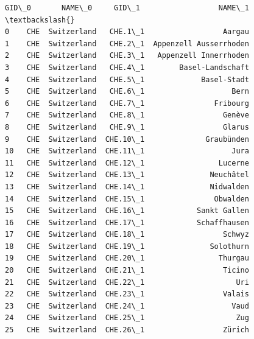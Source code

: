 \documentclass[11pt]{article}
\begin{document}
            \begin{tcolorbox}[breakable, size=fbox, boxrule=.5pt, pad at break*=1mm, opacityfill=0]
\begin{Verbatim}[commandchars=\\\{\}]
   GID\_0       NAME\_0     GID\_1                  NAME\_1  \textbackslash{}
0    CHE  Switzerland   CHE.1\_1                  Aargau
1    CHE  Switzerland   CHE.2\_1  Appenzell Ausserrhoden
2    CHE  Switzerland   CHE.3\_1   Appenzell Innerrhoden
3    CHE  Switzerland   CHE.4\_1        Basel-Landschaft
4    CHE  Switzerland   CHE.5\_1             Basel-Stadt
5    CHE  Switzerland   CHE.6\_1                    Bern
6    CHE  Switzerland   CHE.7\_1                Fribourg
7    CHE  Switzerland   CHE.8\_1                  Genève
8    CHE  Switzerland   CHE.9\_1                  Glarus
9    CHE  Switzerland  CHE.10\_1              Graubünden
10   CHE  Switzerland  CHE.11\_1                    Jura
11   CHE  Switzerland  CHE.12\_1                 Lucerne
12   CHE  Switzerland  CHE.13\_1               Neuchâtel
13   CHE  Switzerland  CHE.14\_1               Nidwalden
14   CHE  Switzerland  CHE.15\_1                Obwalden
15   CHE  Switzerland  CHE.16\_1            Sankt Gallen
16   CHE  Switzerland  CHE.17\_1            Schaffhausen
17   CHE  Switzerland  CHE.18\_1                  Schwyz
18   CHE  Switzerland  CHE.19\_1               Solothurn
19   CHE  Switzerland  CHE.20\_1                 Thurgau
20   CHE  Switzerland  CHE.21\_1                  Ticino
21   CHE  Switzerland  CHE.22\_1                     Uri
22   CHE  Switzerland  CHE.23\_1                  Valais
23   CHE  Switzerland  CHE.24\_1                    Vaud
24   CHE  Switzerland  CHE.25\_1                     Zug
25   CHE  Switzerland  CHE.26\_1                  Zürich


\end{Verbatim}
\end{tcolorbox}
\end{document}
